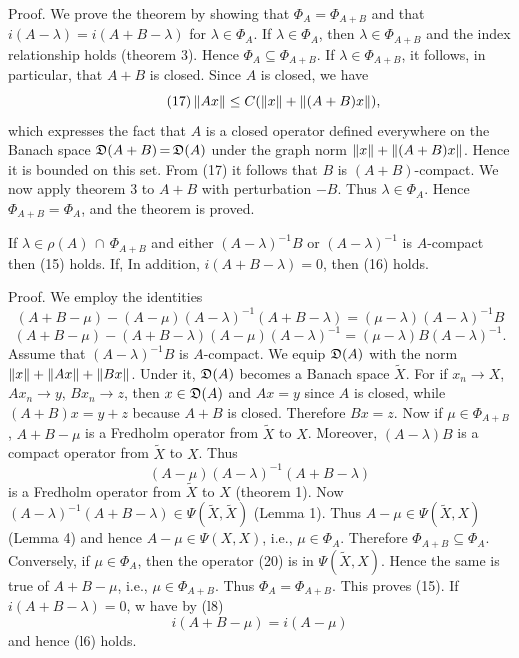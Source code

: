 \documentclass[11pt,twoside]{article}
\begin{document}
Proof.
We prove the theorem by showing that $\Phi_A = \Phi_{A+B}$
and that $i(A-\lambda) = i(A+B-\lambda)$ for $\lambda \in \Phi_A$.
If $\lambda \in \Phi_A$, then
$\lambda \in \Phi_{A+B}$ and the index relationship holds (theorem 3).
Hence $\Phi_A \subseteq \Phi_{A+B}$.
If $\lambda \in \Phi_{A+B}$, it follows, in particular,
that $A+B$ is closed.
Since $A$ is closed, we have
\begin{equation}\tag{17}
\left\lVert Ax \right\rVert \leq C(\left\lVert x \right\rVert + \left\lVert (A+B)x \right\rVert),
\end{equation}
which expresses the fact that $A$ is a closed operator defined everywhere
on the Banach space $\mathfrak{D}(A+B) {\,=\,} \mathfrak{D}(A)$ 
under the graph norm $\left\lVert x \right\rVert + \left\lVert (A+B)x \right\rVert$.
Hence it is bounded on this set.
From (17) it follows that $B$ is $(A+B)$-compact.
We now apply theorem 3 to $A+B$ with perturbation $-B$.
Thus $\lambda \in \Phi_A$.
Hence $\Phi_{A+B} = \Phi_A$,
and the theorem is proved.

\begin{theorem1} %
If $\lambda \in \rho(A) \, \cap \, \Phi_{A+B}$ and either
$(A-\lambda)^{-1}B$ or $(A - \lambda)^{-1}$ is $A$-compact then (15) holds.
If, In addition,
$i(A+B-\lambda) = 0$, then (16) holds.
\end{theorem1}

Proof.
We employ the identities
\begin{equation}\tag{18}
(A+B-\mu) - (A-\mu)(A- \lambda)^{-1}(A+B-\lambda) =
(\mu -\lambda)(A-\lambda)^{-1}B
\end{equation}
\begin{equation}\tag{19}
(A+B-\mu) - (A+B - \lambda)(A- \mu)(A- \lambda)^{-1} =
(\mu - \lambda)B(A - \lambda)^{-1}.
\end{equation}
Assume that $(A-\lambda)^{-1}B$ is $A$-compact.
We equip $\mathfrak{D}(A)$ with the norm $\left\lVert x \right\rVert + \left\lVert Ax \right\rVert + \left\lVert Bx \right\rVert$.
Under it,
$\mathfrak{D}(A)$ becomes a Banach space $\tilde{X}$.
For if $x_n \to X$, $Ax_n \to y$, $Bx_n \to z$,
then $x \in \mathfrak{D}(A)$ and $Ax = y$ since $A$ is closed,
while $(A+B)x = y+z$ because $A+B$ is closed.
Therefore $Bx = z$.
Now if $\mu \in \Phi_{A+B}$, $A+B - \mu$ is a Fredholm operator
from $\tilde{X}$ to $X$.
Moreover,
$(A - \lambda)B$ is a compact operator from $\tilde{X}$ to $X$.
Thus
\begin{equation}\tag{20}
(A- \mu)(A- \lambda)^{-1}(A+B-\lambda)
\end{equation}
is a Fredholm operator from $\tilde{X}$ to $X$ (theorem 1).
Now
$(A-\lambda)^{-1}(A+B-\lambda) \in \Psi(\tilde{X},\tilde{X})$ (Lemma 1).
Thus $A-\mu \in \Psi(\tilde{X},X)$ (Lemma 4)
and hence $A - \mu \in \Psi(X,X)$,
i.e., $\mu \in \Phi_A$.
Therefore $\Phi_{A+B} \subseteq \Phi_A$.
Conversely,
if $\mu \in \Phi_A$,
then the operator (20) is in $\Psi(\tilde{X},X)$.
Hence the same is true of $A+B- \mu$,
i.e.,
$\mu \in \Phi_{A+B}$.
Thus $\Phi_A = \Phi_{A+B}$.
This proves (15).
If $i(A+B-\lambda) = 0$,
w have by (l8)
\[
i(A+B-\mu) = i(A-\mu)
\]
and hence (l6) holds.
\end{document}
